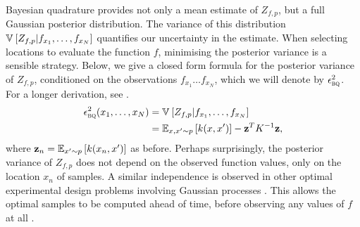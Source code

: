 \documentclass[]{article}
\begin{document}
Bayesian quadrature provides not only a mean estimate of $Z_{f,p}$, but a full Gaussian posterior distribution. The variance of this distribution $\mathbb{V}_{} \left[ {Z_{f,p}|f_{x_1}, \dots, f_{x_N}} \right]$ quantifies our uncertainty in the estimate. When selecting locations to evaluate the function $f$, minimising the posterior variance is a sensible strategy. Below, we give a closed form formula for the posterior variance of $Z_{f,p}$, conditioned on the observations $f_{x_1} \dots f_{x_N}$, which we will denote by $\epsilon^2_{{\textsc{bq}}{}}$.  For a longer derivation, see \cite{BZMonteCarlo}.
\begin{align}
\epsilon^{2}_{{\textsc{bq}}{}}({x}_1,\ldots,{x}_N) & = 
\mathbb{V}_{} \left[ {Z_{f,p}|f_{x_1}, \dots, f_{x_N}} \right] \\
& = \mathbb{E}_{{x}, {x}' \sim p} \left[ {k({x}, {x}')} \right] - {\bf{z}}^T K^{-1} {\bf{z}}\mbox{,}
\label{eq:marg_var_symbolic}
\end{align}
where ${\bf{z}}_n = \mathbb{E}_{{x}' \sim p} \left[ {k({x}_n, {x}')} \right]$ as before. Perhaps surprisingly, the posterior variance of $Z_{f,p}$ does not depend on the observed function values, only on the location $x_n$ of samples. A similar independence is observed in other optimal experimental design problems involving Gaussian processes \citep{guestrin1}. This allows the optimal samples to be computed ahead of time, before observing any values of $f$ at all \citep{minka2000dqr}.
\end{document}
